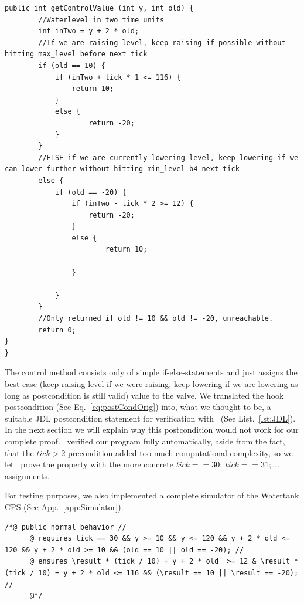 \begin{lstlisting}[label=lst:source_controlMethod]
public int getControlValue (int y, int old) {
		//Waterlevel in two time units
		int inTwo = y + 2 * old;
		//If we are raising level, keep raising if possible without hitting max_level before next tick
		if (old == 10) {
			if (inTwo + tick * 1 <= 116) {
				return 10;
			}
			else {
					return -20;
			}
		}
		//ELSE if we are currently lowering level, keep lowering if we can lower further without hitting min_level b4 next tick
		else {
			if (old == -20) {
				if (inTwo - tick * 2 >= 12) {
					return -20;
				}
				else {
						return 10;
				
				}
		
			}
		}
		//Only returned if old != 10 && old != -20, unreachable.
		return 0;
}
}
\end{lstlisting}

The control method consists only of simple if-else-statements and just assigns the best-case (keep raising level if we were raising, keep lowering if we are lowering as long as postcondition is still valid) value to the valve. We translated the hook postcondition (See  Eq.~\ref{eq:postCondOrig}) into, what we thought to be, a suitable JDL postcondition statement for verification with \key~(See List.~\ref{lst:JDL}). In the next section we will explain why this postcondition would not work for our complete proof. \key~verified our program fully automatically, aside from the fact, that the \(tick>2\) precondition added too much computational complexity, so we let \key~prove the property with the more concrete \(tick==30;~tick==31;\dots\) assignments. 

For testing purposes, we also implemented a complete simulator of the Watertank CPS (See App.~\ref{app:Simulator}).

\begin{lstlisting}[label=lst:JDL]
	/*@ public normal_behavior //
	  @ requires tick == 30 && y >= 10 && y <= 120 && y + 2 * old <= 120 && y + 2 * old >= 10 && (old == 10 || old == -20); //
	  @ ensures \result * (tick / 10) + y + 2 * old  >= 12 & \result * (tick / 10) + y + 2 * old <= 116 && (\result == 10 || \result == -20); //
	  @*/
\end{lstlisting} 

